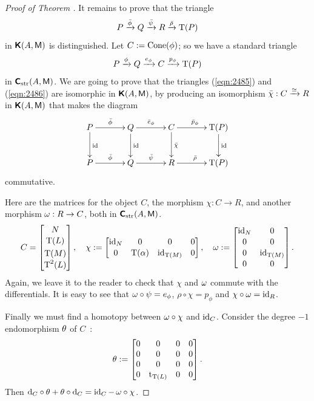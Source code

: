 \begin{proof}[Proof of Theorem \tup{\ref{thm:1255}}]
It remains to prove that the triangle 
\begin{equation} \label{eqn:2485}
 P \xrightarrow{\bar{\phi}} Q \xrightarrow{\bar{\psi}} R \xrightarrow{\bar{\rho}} \operatorname{T}(P) 
\end{equation}
in $\boldsymbol{\mathsf{K}}(A, \operatorname{\mathsf{M}})$ is distinguished. 
Let $C := \operatorname{Cone}(\phi)$; so we have a standard triangle
\begin{equation} \label{eqn:2486}
 P \xrightarrow{\phi} Q \xrightarrow{e_{\phi}} C \xrightarrow{p_{\phi}} \operatorname{T}(P)
\end{equation}
in $\boldsymbol{\mathsf{C}}_{\mathrm{str}}(A, \operatorname{\mathsf{M}})$. We are going to prove that the triangles 
(\ref{eqn:2485}) and (\ref{eqn:2486}) are isomorphic in 
$\boldsymbol{\mathsf{K}}(A, \operatorname{\mathsf{M}})$, by producing an isomorphism 
$\bar{\chi} : C \xrightarrow{\simeq} R$ in $\boldsymbol{\mathsf{K}}(A, \operatorname{\mathsf{M}})$ that makes the diagram 
\[ \UseTips  \xymatrix @C=8ex @R=6ex { 
P
\ar[r]^{\bar{\phi}}
\ar[d]^{\opn{id}}
&
Q
\ar[r]^{\bar{e}_{\phi}}
\ar[d]^{\opn{id}}
&
C
\ar[r]^{\bar{p}_{\phi}}
\ar[d]^{\bar{\chi}}
&
\opn{T}(P)
\ar[d]^{\opn{id}}
\\
P
\ar[r]^{\bar{\phi}}
&
Q
\ar[r]^{\bar{\psi}}
&
R
\ar[r]^{\bar{\rho}}
&
\opn{T}(P)
} \]
commutative. 

Here are the matrices for the object $C$, the morphism 
$\chi : C \to R$, and another morphism 
$\omega: R \to C$, both in $\boldsymbol{\mathsf{C}}_{\mathrm{str}}(A, \operatorname{\mathsf{M}})$. 
\[ C = \begin{bmatrix} N \\[0.1em] \operatorname{T}(L) \\[0.3em] \operatorname{T}(M) 
\\[0.1em] \operatorname{T}^2(L) \end{bmatrix} , \quad 
\chi := \begin{bmatrix} \operatorname{id}_N & 0 & 0 & 0 
\\[0.1em] 0 & \operatorname{T}(\alpha) & \operatorname{id}_{\operatorname{T}(M)} & 0  \end{bmatrix} , \quad 
\omega := \begin{bmatrix} \operatorname{id}_N & 0 \\[0.1em] 0 & 0 
\\[0.1em] 0 & \operatorname{id}_{\operatorname{T}(M)} \\[0.1em] 0 & 0 \end{bmatrix} . \]
Again, we leave it to the reader to check that $\chi$ and $\omega$ commute with 
the differentials. It is easy to see that 
$\omega \circ \psi = e_{\phi}$, 
$\rho \circ \chi = p_{\phi}$ and 
$\chi \circ \omega = \operatorname{id}_R$. 

Finally we must find a homotopy between $\omega \circ \chi$ and $\operatorname{id}_C$.
Consider the degree $-1$ endomorphism $\theta$ of $C$~:
\[ \theta := 
\begin{bmatrix} 0 & 0 & 0 & 0 
\\[0em] 0 & 0 & 0 & 0 
\\[0em] 0 & 0 & 0 & 0 
\\[0em] 0 & \operatorname{t}_{\operatorname{T}(L)} & 0 & 0 \end{bmatrix} . \]
Then 
$\mathrm{d}_C \circ \theta + \theta \circ \mathrm{d}_C = \operatorname{id}_C - \, \omega \circ \chi$.
\end{proof}

